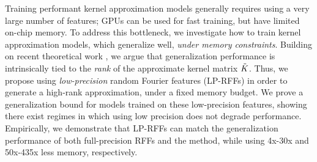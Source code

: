 
Training performant kernel approximation models generally requires using a very large number of features; GPUs can be used for fast training, but have limited on-chip memory. To address this bottleneck, we investigate how to train kernel approximation models, which generalize well, \emph{under memory constraints}.  Building on recent theoretical work \citep{avron17,musco17}, we argue that generalization performance is intrinsically tied to the \emph{rank} of the approximate kernel matrix $\tilde{K}$. Thus, we propose using \emph{low-precision} random Fourier features (LP-RFFs) in order to generate a high-rank approximation, under a fixed memory budget. We prove a generalization bound for models trained on these low-precision features, showing there exist regimes in which using low precision does not degrade performance. Empirically, we demonstrate that LP-RFFs can match the generalization performance of both full-precision RFFs and the \Nystrom method, while using 4x-30x and 50x-435x less memory, respectively.
